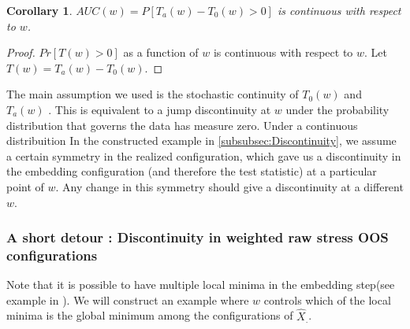 \documentclass[11pt]{article} %
\newtheorem{cor}{Corollary}
\begin{document}
\begin{cor}{
 $AUC(w)=P\left[T_a(w)-T_0(w) >0 \right]$ is continuous with respect to $w$.}
\end{cor}
\begin{proof}
 $Pr\left[T(w)>0 \right]$  as a function of $w$ is continuous with respect to $w$.  Let $T(w)=T_a(w)-T_0(w)$.
\end{proof}


The main assumption we used is the stochastic continuity of $T_0(w)$ and $T_a(w)$ . This is equivalent to  a jump discontinuity at $w$ under the probability distribution that governs the data has measure  zero. Under a continuous distribuition  In the constructed example in \ref{subsubsec:Discontinuity}, we assume a certain symmetry in the realized configuration, which gave us a discontinuity in the embedding configuration (and therefore the test statistic) at a particular point of $w$.  Any change in this symmetry should give a discontinuity at a different $w$.

\subsubsection{ A short detour : Discontinuity in weighted raw stress OOS configurations\label{subsubsec:Discontinuity}}

Note that it is possible to have multiple local minima in the embedding step(see example in \cite{TrossetLocalMin}). We will construct an example  where $w$ controls which of the local minima is the global minimum among the configurations of $\hat{X}_{.}$. 

\end{document}
